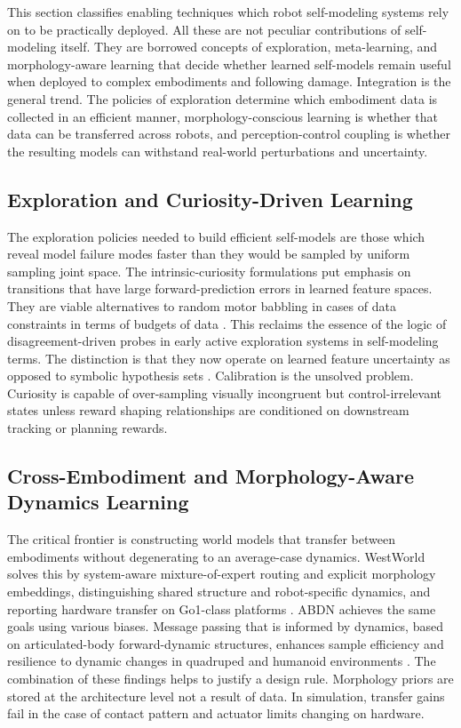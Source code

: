 \documentclass[11pt,a4paper]{article}
\begin{document}
This section classifies enabling techniques which robot self-modeling systems rely on to be practically deployed. All these are not peculiar contributions of self-modeling itself. They are borrowed concepts of exploration, meta-learning, and morphology-aware learning that decide whether learned self-models remain useful when deployed to complex embodiments and following damage. Integration is the general trend. The policies of exploration determine which embodiment data is collected in an efficient manner, morphology-conscious learning is whether that data can be transferred across robots, and perception-control coupling is whether the resulting models can withstand real-world perturbations and uncertainty.

\subsection{Exploration and Curiosity-Driven Learning}

The exploration policies needed to build efficient self-models are those which reveal model failure modes faster than they would be sampled by uniform sampling joint space. The intrinsic-curiosity formulations put emphasis on transitions that have large forward-prediction errors in learned feature spaces. They are viable alternatives to random motor babbling in cases of data constraints in terms of budgets of data \cite{pathak2017curiosity}. This reclaims the essence of the logic of disagreement-driven probes in early active exploration systems in self-modeling terms. The distinction is that they now operate on learned feature uncertainty as opposed to symbolic hypothesis sets \cite{bongard2006resilient}. Calibration is the unsolved problem. Curiosity is capable of over-sampling visually incongruent but control-irrelevant states unless reward shaping relationships are conditioned on downstream tracking or planning rewards.

\subsection{Cross-Embodiment and Morphology-Aware Dynamics Learning}

The critical frontier is constructing world models that transfer between embodiments without degenerating to an average-case dynamics. WestWorld solves this by system-aware mixture-of-expert routing and explicit morphology embeddings, distinguishing shared structure and robot-specific dynamics, and reporting hardware transfer on Go1-class platforms \cite{wang2026westworld}. ABDN achieves the same goals using various biases. Message passing that is informed by dynamics, based on articulated-body forward-dynamic structures, enhances sample efficiency and resilience to dynamic changes in quadruped and humanoid environments \cite{rajeswaran2025embodiedynamics}. The combination of these findings helps to justify a design rule. Morphology priors are stored at the architecture level not a result of data. In simulation, transfer gains fail in the case of contact pattern and actuator limits changing on hardware.
\end{document}
